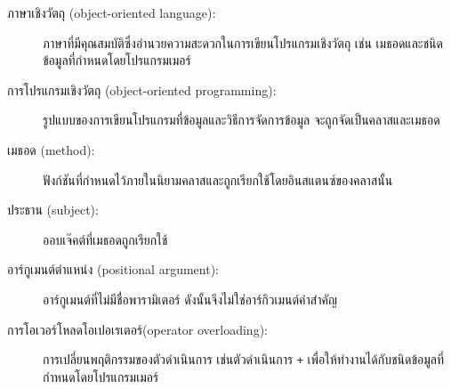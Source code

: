 \begin{description}

  
\item[ภาษาเชิงวัตถุ (object-oriented language):] ภาษาที่มีคุณสมบัติซึ่งอำนวยความสะดวกในการเขียนโปรแกรมเชิงวัตถุ เช่น เมธอดและชนิดข้อมูลที่กำหนดโดยโปรแกรมเมอร์ 


\item[การโปรแกรมเชิงวัตถุ (object-oriented programming):] รูปแบบของการเขียนโปรแกรมที่ข้อมูลและวิธีการจัดการข้อมูล จะถูกจัดเป็นคลาสและเมธอด


\item[เมธอด (method):] ฟังก์ชันที่กำหนดไว้ภายในนิยามคลาสและถูกเรียกใช้โดยอินสแตนซ์ของคลาสนั้น


\item[ประธาน (subject):] ออบเจ๊คต์ที่เมธอดถูกเรียกใช้


\item[อาร์กูเมนต์ตำแหน่ง (positional argument):]  อาร์กูเมนต์ที่ไม่มีชื่อพารามิเตอร์ ดังนั้นจึงไม่ใช่อาร์กิวเมนต์คำสำคัญ


\item[การโอเวอร์โหลดโอเปอเรเตอร์(operator overloading):] การเปลี่ยนพฤติกรรมของตัวดำเนินการ เช่นตัวดำเนินการ {\tt +} เพื่อให้ทำงานได้กับชนิดข้อมูลที่กำหนดโดยโปรแกรมเมอร์


\end{description}
